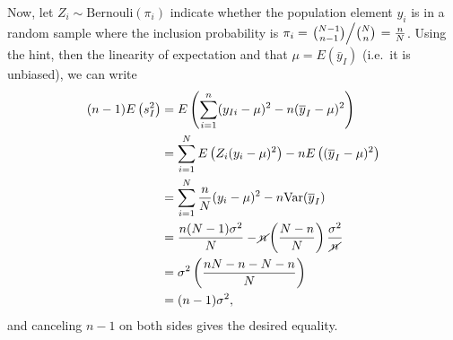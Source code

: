 \documentclass{homework}
\begin{document}
\begin{solution}
  Now, let $Z_i\sim\mathrm{Bernouli}(\pi_i)$ indicate whether the population element $y_i$ is in a random sample where the inclusion probability is $ \pi_i = \left. \binom{N-1}{n-1} \middle/ \binom{N}{n}\right. = \frac nN$. Using the hint, then the linearity of expectation and that $\mu = E(\bar y_I)$ (i.e.~it is unbiased), we can write
  \begin{align*}
    (n-1)E\left(s^2_I\right) 
    &= E\left(\sum_{i=1}^n(y_{Ii} - \mu)^2 - n(\overline y_I - \mu)^2\right)\\
    &= \sum_{i=1}^NE\left(Z_i(y_i - \mu)^2\right) - n E\left((\overline y_I - \mu)^2\right)\\
    &= \sum_{i=1}^N\frac nN(y_i - \mu)^2 - n \mathrm{Var}(\overline y_I)\\
    &= \frac {n(N-1)\sigma^2}N - \cancel n \left(\frac{N - n}N\right)\frac{\sigma^2}{\cancel n}\\
    &= \sigma^2\left(\frac {nN-n - N -n}N\right)\\
    &= (n-1)\sigma^2,
  \end{align*}
  and canceling $n-1$ on both sides gives the desired equality.

\end{solution}
\end{document}
